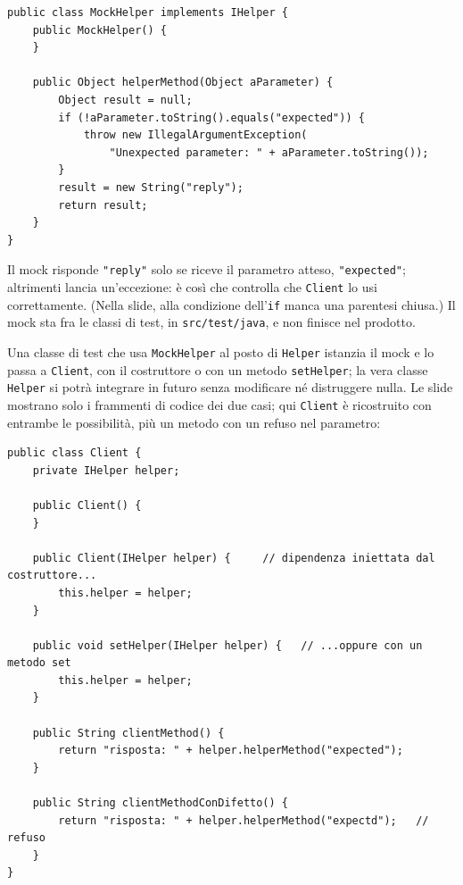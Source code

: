\begin{lstlisting}[style=java, name=MockHelper.java]
public class MockHelper implements IHelper {
    public MockHelper() {
    }

    public Object helperMethod(Object aParameter) {
        Object result = null;
        if (!aParameter.toString().equals("expected")) {
            throw new IllegalArgumentException(
                "Unexpected parameter: " + aParameter.toString());
        }
        result = new String("reply");
        return result;
    }
}
\end{lstlisting}

Il mock risponde \texttt{"reply"} solo se riceve il parametro atteso, \texttt{"expected"}; altrimenti lancia
un'eccezione: è così che controlla che \texttt{Client} lo usi correttamente. (Nella slide, alla condizione
dell'\texttt{if} manca una parentesi chiusa.) Il mock sta fra le classi di test, in \texttt{src/test/java}, e non finisce
nel prodotto.

Una classe di test che usa \texttt{MockHelper} al posto di \texttt{Helper} istanzia il mock e lo passa a
\texttt{Client}, con il costruttore o con un metodo \texttt{setHelper}; la vera classe \texttt{Helper} si potrà
integrare in futuro senza modificare né distruggere nulla. Le slide mostrano solo i frammenti di codice dei due casi;
qui \texttt{Client} è ricostruito con entrambe le possibilità, più un metodo con un refuso nel parametro:

\begin{lstlisting}[style=java, name=Client.java]
public class Client {
    private IHelper helper;

    public Client() {
    }

    public Client(IHelper helper) {     // dipendenza iniettata dal costruttore...
        this.helper = helper;
    }

    public void setHelper(IHelper helper) {   // ...oppure con un metodo set
        this.helper = helper;
    }

    public String clientMethod() {
        return "risposta: " + helper.helperMethod("expected");
    }

    public String clientMethodConDifetto() {
        return "risposta: " + helper.helperMethod("expectd");   // refuso
    }
}
\end{lstlisting}

